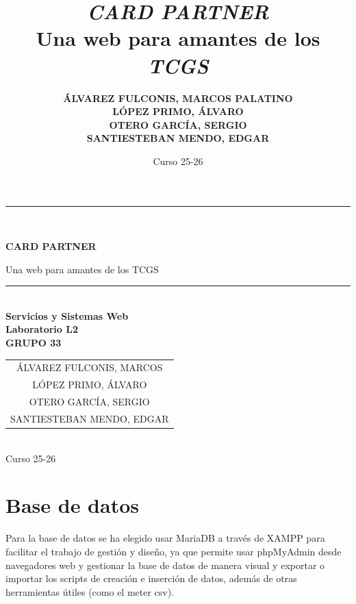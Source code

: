 \documentclass[10pt]{article}
\title{\textit{CARD PARTNER}\\ Una web para amantes de los \textit{TCGS}}
\author{
	\textbf{\small ÁLVAREZ FULCONIS, MARCOS PALATINO}\\
	\textbf{\small LÓPEZ PRIMO, ÁLVARO}\\
	\textbf{\small OTERO GARCÍA, SERGIO}\\
	\textbf{\small SANTIESTEBAN MENDO, EDGAR}
}
\date{Curso 25-26}
\begin{document}
	
	\begin{titlepage}
		\centering
		\rule{\linewidth}{0.2mm}\\[0.4cm]
		{\huge\bfseries CARD PARTNER\par}
		{\large Una web para amantes de los TCGS\par}
		\rule{\linewidth}{0.2mm}\\[1.5cm]
		{\Large\bfseries Servicios y Sistemas Web}\\[0.3cm]
		{\large\bfseries Laboratorio L2 \\ GRUPO 33}\\[1cm]
		{\Large \begin{tabular}{c} ÁLVAREZ FULCONIS, MARCOS \\ LÓPEZ PRIMO, ÁLVARO \\ OTERO GARCÍA, SERGIO \\ SANTIESTEBAN MENDO, EDGAR \end{tabular}}\\[1.5cm]
		{\Large Curso 25-26}
	\end{titlepage}
	
	\tableofcontents \newpage
	
	\setcounter{page}{1}
	
	\section{Base de datos}
		Para la base de datos se ha elegido usar MariaDB a través de XAMPP para facilitar el trabajo de gestión y diseño, ya que permite usar phpMyAdmin desde navegadores web y gestionar la base de datos de manera visual y exportar o importar los scripts de creación e inserción de datos,  además de otras herramientas útiles (como el meter csv).
\end{document}
